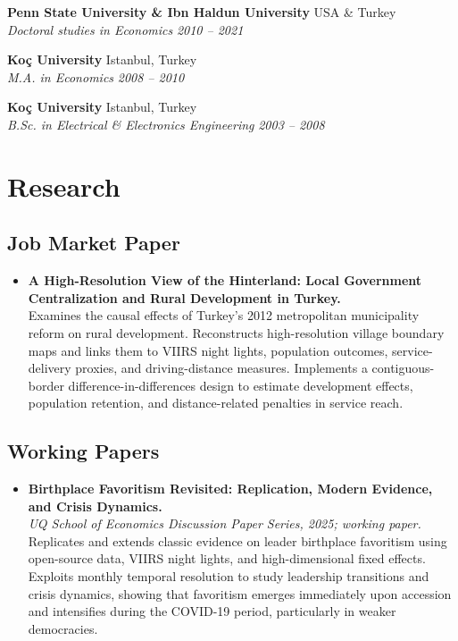 \documentclass[11pt,a4paper]{article}
\newcommand{\entry}[4]{
    \noindent \textbf{#1} \hfill {\color{secondary}#2} \\
    \textit{#3} \hfill \textit{\color{secondary}#4}\vspace{1mm}
}
\begin{document}
\entry{Penn State University \& Ibn Haldun University}{USA \& Turkey}{Doctoral studies in Economics}{2010 -- 2021}

\entry{Ko\c{c} University}{Istanbul, Turkey}{M.A. in Economics}{2008 -- 2010}

\entry{Ko\c{c} University}{Istanbul, Turkey}{B.Sc. in Electrical \& Electronics Engineering}{2003 -- 2008}

\section{Research}


\subsection*{Job Market Paper}

\begin{itemize}
    \item \textbf{A High-Resolution View of the Hinterland: Local Government Centralization and Rural Development in Turkey.} \\
    Examines the causal effects of Turkey’s 2012 metropolitan municipality reform on rural development. Reconstructs high-resolution village boundary maps and links them to VIIRS night lights, population outcomes, service-delivery proxies, and driving-distance measures. Implements a contiguous-border difference-in-differences design to estimate development effects, population retention, and distance-related penalties in service reach.
\end{itemize}

\subsection*{Working Papers}

\begin{itemize}
    \item \textbf{Birthplace Favoritism Revisited: Replication, Modern Evidence, and Crisis Dynamics.} \\
    \textit{UQ School of Economics Discussion Paper Series, 2025; working paper.} \\
    Replicates and extends classic evidence on leader birthplace favoritism using open-source data, VIIRS night lights, and high-dimensional fixed effects. Exploits monthly temporal resolution to study leadership transitions and crisis dynamics, showing that favoritism emerges immediately upon accession and intensifies during the COVID-19 period, particularly in weaker democracies.
\end{itemize}
\end{document}
